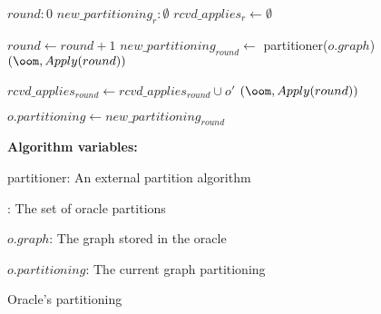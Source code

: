\begin{algorithm}[t!]
    \small

    \begin{distribalgo}[1]

        \vspace{1.5mm}

            \STATE $round: 0$
            \STATE $new\_partitioning_{r}: \emptyset$
            \STATE $rcvd\_applies_{r} \leftarrow \emptyset$

        \ENDINDENT
        \vspace{1.5mm}
            \vspace{1.5mm}
                \STATE $round \leftarrow round + 1$
                \STATE $new\_partitioning_{round} \leftarrow$ partitioner($o.graph$)
                \STATE \rmcast$(\oom, Apply(round))$
            \ENDINDENT

            \vspace{1.5mm}

                \STATE $rcvd\_applies_{round} \leftarrow rcvd\_applies_{round} \cup o'$
                    \STATE \amcast$(\oom, Apply(round))$
                \ENDIF
            \ENDINDENT

            \vspace{1.5mm}
            
                \STATE $o.partitioning \leftarrow new\_partitioning_{round}$
            \ENDINDENT

        \ENDINDENT

    \vspace{1.7mm}

    \textbf{Algorithm variables:}

    \vspace{1.25mm}

    partitioner: An external partition algorithm

    \vspace{1.25mm}

    \oo: The set of oracle partitions

    \vspace{1mm}

    $o.graph$: The graph stored in the oracle

    \vspace{1mm}

    $o.partitioning$: The current graph partitioning

    \caption{Oracle's partitioning}
    \label{alg:oracle_partition}
\end{distribalgo}
\end{algorithm}
